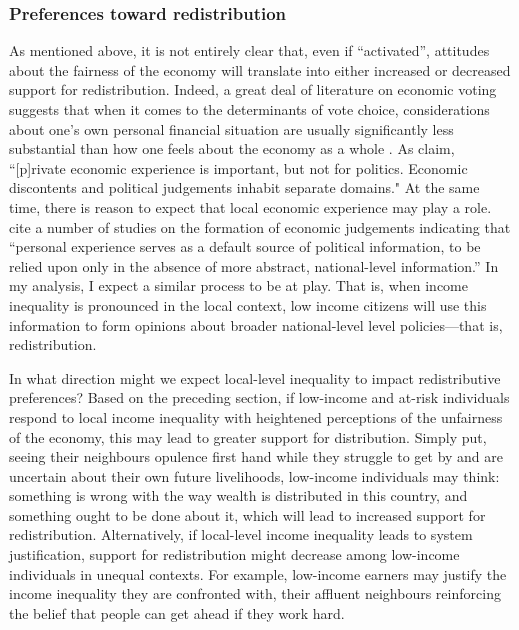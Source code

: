\documentclass[12pt, letter]{scrartcl}
\begin{document}
\doublespacing


\subsubsection{Preferences toward redistribution}

As mentioned above, it is not entirely clear that, even if ``activated'', attitudes about the fairness of the economy will translate into either increased or decreased support for redistribution. Indeed, a great deal of literature on economic voting suggests that when it comes to the determinants of vote choice, considerations about one's own personal financial situation are usually significantly less substantial than how one feels about the economy as a whole \parencite{lewis2013vp}. As \parencite[523]{kinder1979economic} claim, ``[p]rivate economic experience is important, but not for politics. Economic discontents and political judgements inhabit separate domains." At the same time, there is reason to expect that local economic experience may play a role. \textcite[254]{mondak2000persuasion} cite a number of studies on the formation of economic judgements indicating that ``personal experience serves as a default source of political information, to be relied upon only in the absence of more abstract, national-level information.'' In my analysis, I expect a similar process to be at play. That is, when income inequality is pronounced in the local context, low income citizens will use this information to form opinions about broader national-level level policies---that is, redistribution. 

In what direction might we expect local-level inequality to impact redistributive preferences? Based on the preceding section, if low-income and at-risk individuals respond to local income inequality with heightened perceptions of the unfairness of the economy, this may lead to greater support for distribution. Simply put, seeing their neighbours opulence first hand while they struggle to get by and are uncertain about their own future livelihoods, low-income individuals may think: something is wrong with the way wealth is distributed in this country, and something ought to be done about it, which will lead to increased support for redistribution. Alternatively, if local-level income inequality leads to system justification, support for redistribution might decrease among low-income individuals in unequal contexts. For example, low-income earners may justify the income inequality they are confronted with, their affluent neighbours reinforcing the belief that people can get ahead if they work hard. 
\end{document}
